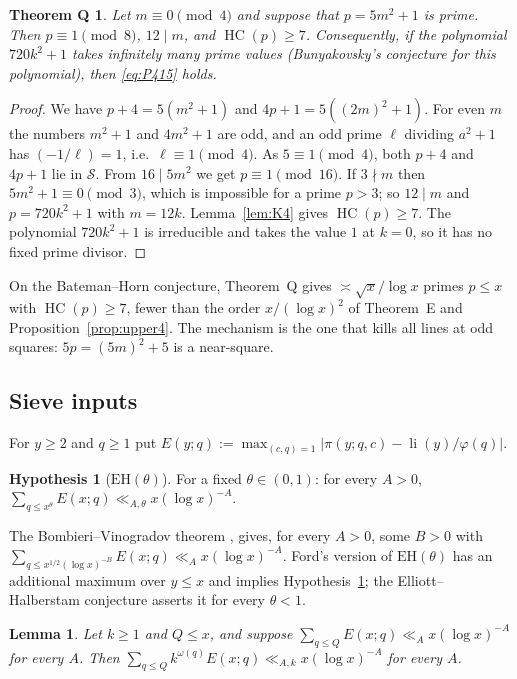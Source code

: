\documentclass[11pt,reqno]{amsart}
\newtheorem{lemma}[theorem]{Lemma}
\newtheorem*{thmQ}{Theorem Q}
\theoremstyle{definition}
\newtheorem{hypothesis}[theorem]{Hypothesis}
\newcommand{\cS}{\mathcal S}
\newcommand{\HC}{\operatorname{HC}}
\newcommand{\li}{\operatorname{li}}
\newcommand{\EH}{\mathrm{EH}}
\begin{document}
\begin{thmQ}
Let $m\equiv0\pmod4$ and suppose that $p=5m^2+1$ is prime.  Then
$p\equiv1\pmod8$, $12\mid m$, and $\HC(p)\ge7$.  Consequently, if the
polynomial $720k^2+1$ takes infinitely many prime values (Bunyakovsky's
conjecture for this polynomial), then \eqref{eq:P415} holds.
\end{thmQ}

\begin{proof}
We have $p+4=5(m^2+1)$ and $4p+1=5((2m)^2+1)$.  For even $m$ the numbers
$m^2+1$ and $4m^2+1$ are odd, and an odd prime $\ell$ dividing $a^2+1$
has $(-1/\ell)=1$, i.e.\ $\ell\equiv1\pmod4$.  As $5\equiv1\pmod4$,
both $p+4$ and $4p+1$ lie in $\cS$.  From $16\mid5m^2$ we get
$p\equiv1\pmod{16}$.  If $3\nmid m$ then $5m^2+1\equiv0\pmod3$, which is
impossible for a prime $p>3$; so $12\mid m$ and $p=720k^2+1$ with
$m=12k$.  Lemma~\ref{lem:K4} gives $\HC(p)\ge7$.  The polynomial
$720k^2+1$ is irreducible and takes the value $1$ at $k=0$, so it has no
fixed prime divisor.
\end{proof}

On the Bateman--Horn conjecture, Theorem~Q gives $\asymp\sqrt x/\log x$
primes $p\le x$ with $\HC(p)\ge7$, fewer than the order $x/(\log x)^2$ of
Theorem~E and Proposition~\ref{prop:upper4}.  The mechanism is the one
that kills all lines at odd squares: $5p=(5m)^2+5$ is a near-square.

\subsection{Sieve inputs}\label{sec:sieveinputs}

For $y\ge2$ and $q\ge1$ put
$E(y;q):=\max_{(c,q)=1}\bigl|\pi(y;q,c)-\li(y)/\varphi(q)\bigr|$.

\begin{hypothesis}[$\EH(\theta)$]\label{hyp:EH}
For a fixed $\theta\in(0,1)$: for every $A>0$,
$\sum_{q\le x^\theta}E(x;q)\ll_{A,\theta}x(\log x)^{-A}$.
\end{hypothesis}

The Bombieri--Vinogradov theorem \cite{Bombieri}, \cite[Thm.~3.4]{Ford}
gives, for every $A>0$, some $B>0$ with
$\sum_{q\le x^{1/2}(\log x)^{-B}}E(x;q)\ll_Ax(\log x)^{-A}$.  Ford's
version of $\EH(\theta)$ \cite[(7.6)]{Ford} has an additional maximum over
$y\le x$ and implies Hypothesis~\ref{hyp:EH}; the Elliott--Halberstam
conjecture \cite[Conj.~7.3]{Ford} asserts it for every $\theta<1$.

\begin{lemma}\label{lem:weights}
Let $k\ge1$ and $Q\le x$, and suppose $\sum_{q\le Q}E(x;q)\ll_Ax(\log x)^{-A}$
for every $A$.  Then $\sum_{q\le Q}k^{\omega(q)}E(x;q)\ll_{A,k}x(\log x)^{-A}$
for every $A$.
\end{lemma}
\end{document}
